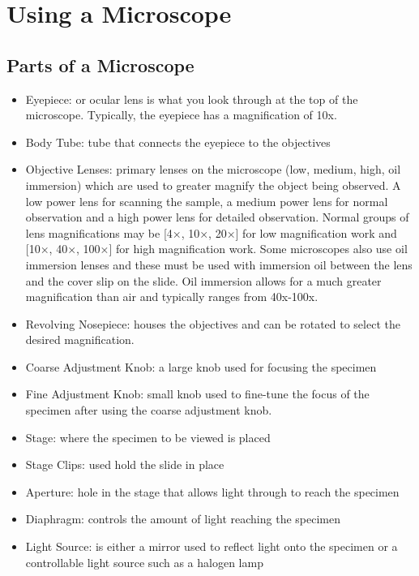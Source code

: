 \chapter{Using a Microscope} 

\section{Parts of a Microscope}

\begin{itemize}

\item{Eyepiece: or ocular lens is what you look through at the top of the microscope. Typically, the eyepiece has a magnification of 10x.}

\item{Body Tube: tube that connects the eyepiece to the objectives}

\item{Objective Lenses: primary lenses on the microscope (low, medium, high, oil immersion) which are used to greater magnify the object being observed. A low power lens for scanning the sample, a medium power lens for normal observation and a high power lens for detailed observation. Normal groups of lens magnifications may be [4×, 10×, 20×] for low magnification work and [10×, 40×, 100×] for high magnification work. Some microscopes also use oil immersion lenses and these must be used with immersion oil between the lens and the cover slip on the slide. Oil immersion allows for a much greater magnification than air and typically ranges from 40x-100x.}

\item{Revolving Nosepiece: houses the objectives and can be rotated to select the desired magnification.}

\item{Coarse Adjustment Knob: a large knob used for focusing the specimen}

\item{Fine Adjustment Knob: small knob used to fine-tune the focus of the specimen after using the coarse adjustment knob.}

\item{Stage: where the specimen to be viewed is placed}

\item{Stage Clips: used hold the slide in place}

\item{Aperture: hole in the stage that allows light through to reach the specimen}

\item{Diaphragm: controls the amount of light reaching the specimen}

\item{Light Source: is either a mirror used to reflect light onto the specimen or a controllable light source such as a halogen lamp}

\end{itemize}

